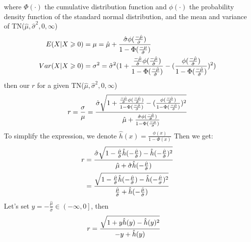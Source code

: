 where $\Phi(\cdot)$ the cumulative distribution function and $\phi(\cdot)$ the probability density function of the standard normal distribution, and the mean and variance of TN($\hat{\mu}, \hat{\sigma}^2, 0,\infty$)
\begin{equation}\notag
	\begin{split}
	E(X | X \geqslant 0)& = \mu =  \hat{\mu} + \frac{\hat{\sigma} \phi(\frac{-\hat{\mu}}{\hat{\sigma}})}{1 - \Phi(\frac{-\mu}{\hat{\sigma}})}\\
	Var( X | X \geqslant 0) &= \sigma^2 = \hat{\sigma}^2 (1+\frac{\frac{-\hat{\mu}}{\hat{\sigma}} \phi(\frac{-\hat{\mu}}{\hat{\sigma}})}{1 - \Phi(\frac{-\hat{\mu}}{\hat{\sigma}})}-(\frac{ \phi(\frac{-\hat{\mu}}{\hat{\sigma}})}{1 - \Phi(\frac{-\hat{\mu}}{\hat{\sigma}})})^2)
	\end{split}
\end{equation}
then our $r$ for a given TN($\hat{\mu}, \hat{\sigma}^2, 0,\infty$)
\begin{equation}\notag
	r = \frac{\sigma}{\mu} =  \frac{\hat{\sigma} \sqrt{ 1+\frac{\frac{-\hat{\mu}}{\hat{\sigma}} \phi(\frac{-\hat{\mu}}{\hat{\sigma}})}{1 - \Phi(\frac{-\hat{\mu}}{\hat{\sigma}})}-(\frac{ \phi(\frac{-\hat{\mu}}{\hat{\sigma}})}{1 - \Phi(\frac{-\hat{\mu}}{\hat{\sigma}})})^2}}{  \hat{\mu} + \frac{\hat{\sigma} \phi(\frac{-\hat{\mu}}{\hat{\sigma}})}{1 - \Phi(\frac{-\mu}{\hat{\sigma}})}}
\end{equation}
To simplify the expression, we denote $\hat{h}(x) = \frac{\phi(x)}{1 - \Phi(x)}$
Then we get:
\begin{equation}\notag
	\begin{split}
		r &= \frac{\hat{\sigma} \sqrt{1-\frac{ \hat{\mu}}{\hat{\sigma}} \hat{h}(-\frac{ \hat{\mu}}{\hat{\sigma}}) -\hat{h}(-\frac{ \hat{\mu}}{\hat{\sigma}})^2}}{  \hat{\mu} + \hat{\sigma} \hat{h}(-\frac{ \hat{\mu}}{\hat{\sigma}})} \\&= \frac{ \sqrt{1-\frac{ \hat{\mu}}{\hat{\sigma}} \hat{h}(-\frac{ \hat{\mu}}{\hat{\sigma}}) -\hat{h}(-\frac{ \hat{\mu}}{\sigma})^2}}{ \frac{ \hat{\mu}}{\hat{\sigma}} + \hat{h}(-\frac{ \hat{\mu}}{\hat{\sigma}})} 
	\end{split}
\end{equation} 
Let's set $y = -\frac{ \hat{\mu}}{\hat{\sigma}} \in \left(-\infty, 0 \right]$, then
\begin{equation}\notag
	\begin{split}
		r &= \frac{ \sqrt{1+y\hat{h}(y) -\hat{h}(y)^2}}{ -y + \hat{h}(y)} 
	\end{split}
\end{equation} 

